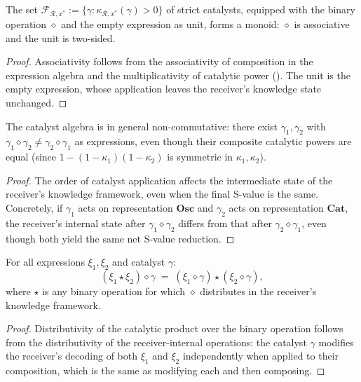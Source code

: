 \begin{proposition}
\label{prop:catalyst-monoid}
The set $\mathcal{F}_{\mathcal{R}, x^*} := \{\gamma : \kappa_{\mathcal{R}, x^*}(\gamma) > 0\}$
of strict catalysts, equipped with the binary operation $\diamond$ and the
empty expression as unit, forms a monoid: $\diamond$ is associative and the
unit is two-sided.
\end{proposition}

\begin{proof}
Associativity follows from the associativity of composition in the expression
algebra and the multiplicativity of catalytic power ().
The unit is the empty expression, whose application leaves the receiver's
knowledge state unchanged.
\end{proof}

\begin{proposition}
\label{prop:non-comm-catalyst}
The catalyst algebra is in general non-commutative: there exist
$\gamma_1, \gamma_2$ with
$\gamma_1 \diamond \gamma_2 \neq \gamma_2 \diamond \gamma_1$ as
expressions, even though their composite catalytic powers are equal
(since $1 - (1-\kappa_1)(1-\kappa_2)$ is symmetric in $\kappa_1, \kappa_2$).
\end{proposition}

\begin{proof}
The order of catalyst application affects the intermediate state of the
receiver's knowledge framework, even when the final S-value is the same.
Concretely, if $\gamma_1$ acts on representation $\mathbf{Osc}$ and
$\gamma_2$ acts on representation $\mathbf{Cat}$, the receiver's internal
state after $\gamma_1 \diamond \gamma_2$ differs from that after
$\gamma_2 \diamond \gamma_1$, even though both yield the same net S-value
reduction.
\end{proof}

\begin{theorem}
\label{thm:dist-cat}
For all expressions $\xi_1, \xi_2$ and catalyst $\gamma$:
\[
  (\xi_1 \star \xi_2) \diamond \gamma
  \;=\; (\xi_1 \diamond \gamma) \star (\xi_2 \diamond \gamma) ,
\]
where $\star$ is any binary operation for which $\diamond$ distributes in
the receiver's knowledge framework.
\end{theorem}

\begin{proof}
Distributivity of the catalytic product over the binary operation follows
from the distributivity of the receiver-internal operations: the catalyst
$\gamma$ modifies the receiver's decoding of both $\xi_1$ and $\xi_2$
independently when applied to their composition, which is the same as
modifying each and then composing.
\end{proof}

